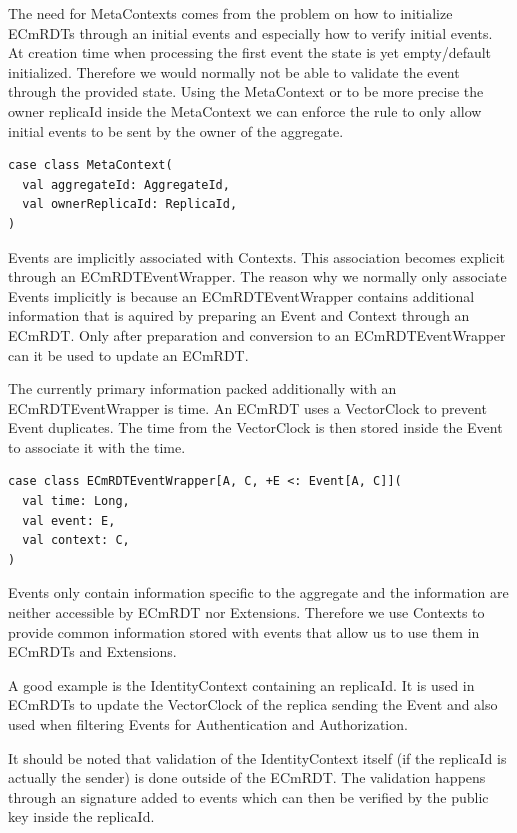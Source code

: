 \documentclass[
	ngerman,
	ruledheaders=section,   %
	class=report,		    %
	thesis={type=bachelor}, %
	accentcolor=9c,			%
	custommargins=true,    %
	marginpar=false,        %
	parskip=half-,          %
	fontsize=11pt,          %
]{tudapub}
\begin{document}
The need for MetaContexts comes from the problem on how to initialize ECmRDTs through an initial events and especially how to verify initial events. At creation time when processing the first event the state is yet empty/default initialized. Therefore we would normally not be able to validate the event through the provided state. Using the MetaContext or to be more precise the owner replicaId inside the MetaContext we can enforce the rule to only allow initial events to be sent by the owner of the aggregate.

\begin{lstlisting}
case class MetaContext(
  val aggregateId: AggregateId,
  val ownerReplicaId: ReplicaId,
)
\end{lstlisting}

Events are implicitly associated with Contexts. This association becomes explicit through an ECmRDTEventWrapper. The reason why we normally only associate Events implicitly is because an ECmRDTEventWrapper contains additional information that is aquired by preparing an Event and Context through an ECmRDT. Only after preparation and conversion to an ECmRDTEventWrapper can it be used to update an ECmRDT. 

The currently primary information packed additionally with an ECmRDTEventWrapper is time. An ECmRDT uses a VectorClock to prevent Event duplicates. The time from the VectorClock is then stored inside the Event to associate it with the time.

\begin{lstlisting}
case class ECmRDTEventWrapper[A, C, +E <: Event[A, C]](
  val time: Long,
  val event: E,
  val context: C,
)
\end{lstlisting}

Events only contain information specific to the aggregate and the information are neither accessible by ECmRDT nor Extensions. Therefore we use Contexts to provide common information stored with events that allow us to use them in ECmRDTs and Extensions. 

A good example is the IdentityContext containing an replicaId. It is used in ECmRDTs to update the VectorClock of the replica sending the Event and also used when filtering Events for Authentication and Authorization.

It should be noted that validation of the IdentityContext itself (if the replicaId is actually the sender) is done outside of the ECmRDT. The validation happens through an signature added to events which can then be verified by the public key inside the replicaId.
\end{document}
